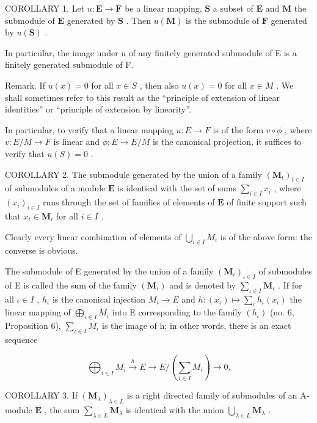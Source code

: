 COROLLARY 1. Let \(u: \mathbf{E} \to \mathbf{F}\) be a linear mapping, \(\mathbf{S}\) a subset of \(\mathbf{E}\) and \(\mathbf{M}\) the submodule of \(\mathbf{E}\) generated by \(\mathbf{S}\) . Then \(u(\mathbf{M})\) is the submodule of \(\mathbf{F}\) generated by \(u(\mathbf{S})\) .

In particular, the image under u of any finitely generated submodule of E is a finitely generated submodule of F.

Remark. If \(u(x) = 0\) for all \(x \in S\) , then also \(u(x) = 0\) for all \(x \in M\) . We shall sometimes refer to this result as the ``principle of extension of linear identities'' or ``principle of extension by linearity''.

In particular, to verify that a linear mapping \(u:E\to F\) is of the form \(v\circ\phi\) , where \(v:E/M\to F\) is linear and \(\phi:E\to E/M\) is the canonical projection, it suffices to verify that \(u(S)=0\) .

COROLLARY 2. The submodule generated by the union of a family \((\mathbf{M}_{t})_{t\in I}\) of submodules of a module \(\mathbf{E}\) is identical with the set of sums \(\sum_{i\in I}x_i\) , where \((x_{i})_{i\in I}\) runs through the set of families of elements of \(\mathbf{E}\) of finite support such that \(x_{i}\in \mathbf{M}_{i}\) for all \(i\in I\) .

Clearly every linear combination of elements of \(\bigcup_{i\in I}M_i\) is of the above form: the converse is obvious.

The submodule of E generated by the union of a family \((\mathbf{M}_{\iota})_{\iota\in I}\) of submodules of E is called the sum of the family \((\mathbf{M}_{\iota})\) and is denoted by \(\sum_{\iota\in I}\mathbf{M}_{\iota}\) . If for all \(\iota\in I\) , \(h_{\iota}\) is the canonical injection \(M_{\iota}\to E\) and \(h:(x_{\iota})\mapsto\sum_{\iota}h_{\iota}(x_{\iota})\) the linear mapping of \(\bigoplus_{\iota\in I}M_{\iota}\) into E corresponding to the family \((h_{\iota})\) (no. 6, Proposition 6), \(\sum_{\iota\in I}M_{\iota}\) is the image of h; in other words, there is an exact sequence

\[
\bigoplus_ {i \in I} M _ {i} \xrightarrow {h} E \longrightarrow E / \left(\sum_ {i \in I} M _ {i}\right) \longrightarrow 0.\tag{28}
\]

COROLLARY 3. If \((\mathbf{M}_{\lambda})_{\lambda \in L}\) is a right directed family of submodules of an A-module \(\mathbf{E}\) , the sum \(\sum_{\lambda \in L} \mathbf{M}_{\lambda}\) is identical with the union \(\bigcup_{\lambda \in L} \mathbf{M}_{\lambda}\) .

